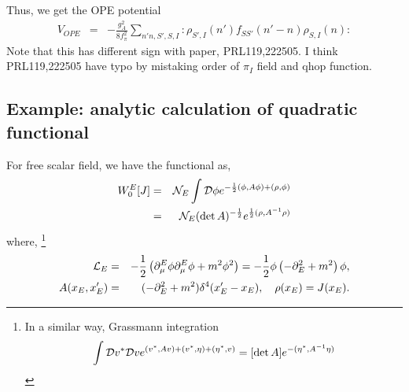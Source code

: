 \documentclass[10pt]{book}
\newcommand{\bea}{\begin{eqnarray}}
\newcommand{\eea}{\end{eqnarray}}
\newcommand{\no}{\nonumber \\}
\newcommand{\del}{\partial}
\begin{document}
Thus, we get the OPE potential 
\bea 
V_{OPE}&=&-\frac{g_A^2}{8f_\pi^2}\sum_{n'n,S',S,I} : \rho_{S',I}(n')f_{SS'}(n'-n)\rho_{S,I}(n):
\eea  
Note that this has different sign with paper, PRL119,222505. 
I think PRL119,222505 have typo by mistaking order of $\pi_I$ field and qhop function.   

\subsection{Example: analytic calculation of quadratic functional  }  
For free scalar field, we have the functional as,
\bea 
W^E_0[J]&=&{\cal N}_E \int {\cal D}\phi e^{-\frac{1}{2}(\phi,A\phi)+(\rho,\phi)}\no 
        &=&{\cal N}_E(\det A)^{-\frac{1}{2}} e^{\frac{1}{2}(\rho,A^{-1} \rho)}
\eea 
where,
\footnote{In a similar way, Grassmann integration
\bea 
\int {\cal D}v^* {\cal D}v e^{ (v^*, A v)+(v^*,\eta)+(\eta^*,v)}
  =[\det A]e^{-(\eta^*, A^{-1}\eta)}
\eea 

}
\bea
{\cal L}_E&=&-\frac{1}{2}\left(\del^E_\mu\phi\del^E_\mu\phi+m^2\phi^2\right)
           =-\frac{1}{2}\phi\left(-\del^2_E+m^2\right)\phi
 ,\no 
A(x_E,x'_E)&=&(-\del_E^2 +m^2)\delta^4(x'_E-x_E), \quad \rho(x_E)=J(x_E).
\eea 
\end{document}
